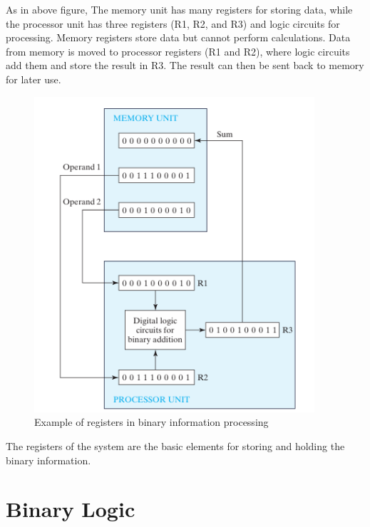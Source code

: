 \documentclass[a4paper,12pt]{article}
\begin{document}
As in above figure, The memory unit has many registers for storing data, while the processor unit has three registers (R1, R2, and R3) and logic circuits for processing. Memory registers store data but cannot perform calculations. Data from memory is moved to processor registers (R1 and R2), where logic circuits add them and store the result in R3. The result can then be sent back to memory for later use. 
\begin{figure}
    \centering
    \includegraphics[width=0.926\textwidth]{figs/figure2.png}
    \caption{Example of registers in binary information processing}
    \label{fig:enter-label}
\end{figure}
The registers of the system are the basic elements for storing and holding the binary information. 

\newpage

\section{Binary Logic}
\end{document}
